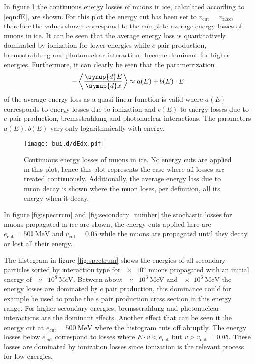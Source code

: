 In figure \ref{fig:dEdx} the continuous energy losses of muons in ice, calculated according to \eqref{eqn:fE}, are shown.
For this plot the energy cut has been set to $v_\text{cut} = v_\text{max}$, therefore the values shown correspond to the complete average energy losses of muons in ice. 
It can be seen that the average energy loss is quantitatively dominated by ionization for lower energies while $e$ pair production, bremsstrahlung and photonuclear interactions become dominant for higher energies.
Furthermore, it can clearly be seen that the parametrization
%
\begin{equation}
	- \left\langle \frac{\symup{d}E}{\symup{d}x} \right\rangle \approx a(E) + b(E) \cdot E
\end{equation}
%
of the average energy loss as a quasi-linear function is valid where $a(E)$ corresponds to energy losses due to ionization and $b(E)$ to energy losses due to $e$ pair production, bremsstrahlung and photonuclear interactions.
The parameters $a(E), b(E)$ vary only logarithmically with energy.

\begin{figure}
    \centering
    \texttt{[image: build/dEdx.pdf]}
    \caption{Continuous energy losses of muons in ice. No energy cuts are applied in this plot, hence this plot represents the case where all losses are treated continuously. Additionally, the average energy loss due to muon decay is shown where the muon loses, per definition, all its energy when it decay. }
    \label{fig:dEdx}
\end{figure}

In figure \ref{fig:spectrum} and \ref{fig:secondary_number} the stochastic losses for muons propagated in ice are shown, the energy cuts applied here are $e_\text{cut} = \SI{500}{\mega\electronvolt}$ and $v_\text{cut} = \num{0.05}$ while the muons are propagated until they decay or lost all their energy.

The histogram in figure \ref{fig:spectrum} shows the energies of all secondary particles sorted by interaction type for $\num{e5}$ muons propagated with an initial energy of $\SI{e8}{\mega\electronvolt}$.
Between about $\SI{e3}{\mega\electronvolt}$ and $\SI{e6}{\mega\electronvolt}$ the energy losses are dominated by $e$ pair production, this dominance could for example be used to probe the $e$ pair production cross section in this energy range.
For higher secondary energies, bremsstrahlung and photonuclear interactions are the dominant effects.
Another effect that can be seen it the energy cut at $e_\text{cut} = \SI{500}{\mega\electronvolt}$ where the histogram cuts off abruptly.
The energy losses below $e_\text{cut}$ correspond to losses where $E \cdot v < e_\text{cut}$ but $v > v_\text{cut} = 0.05$.
These losses are dominated by ionization losses since ionization is the relevant process for low energies.

